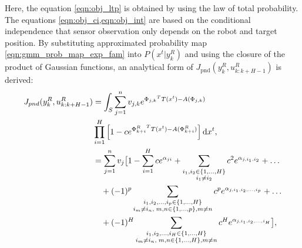 \documentclass[twocolumn,10pt]{asme2e}
\begin{document}
Here, the equation \cref{eqn:obj_ltp} is obtained by using the law of total probability.
The equations \cref{eqn:obj_ci,eqn:obj_int} are based on the conditional independence that sensor observation only depends on the robot and target position.
By substituting approximated probability map \cref{eqn:gmm_prob_map_exp_fam} into $P(x^t|y^R_{k})$ and using the closure of the product of Gaussian functions, an analytical form of $J_\text{pnd}(y^R_k,u^R_{k:k+H-1})$ is derived:
\begin{subequations}\label{eqn:obj_analy}
	\begin{align}
		J_{pnd}(y^R_k,u^R_{k:k+H-1})&=\int_S \sum\limits_{j=1}^{n}v_{j,k} e^{{\Phi_{j,k}}^TT(x^t)-A(\Phi_{j,k})}\notag\\ &\prod\limits_{i=1}^{H}\left[ 1-ce^{{\Phi^R_{k+i}}^TT(x^t)-A(\Phi^R_{k+i})}\right] \mathrm{d}x^t,\label{eqn:sub}\\
		& =\sum\limits_{j=1}^n v_j\big[1-\sum^H_{i=1} ce^{\alpha_{ji}}+\sum\limits_{\substack{ i_1,i_2 \in \left\lbrace 1,\dots,H\right\rbrace \\i_1\neq i_2}}c^2e^{\alpha_{j,i_1,i_2}}+\dots\notag\\
		&\quad+(-1)^p\sum\limits_{\substack{i_1,i_2,\dots,i_p\in \left\lbrace 1,\dots,H\right\rbrace\\i_m\neq i_n,\;m,n\in \left\lbrace 1,\dots,p\right\rbrace,m\neq n}}c^pe^{\alpha_{j,i_1,i_2,\dots,i_p}}+\dots\notag\\
		&\quad+(-1)^H\sum\limits_{\substack{i_1,i_2,\dots,i_H\in \left\lbrace 1,\dots,H\right\rbrace\\i_m\neq i_n,\;m,n\in \left\lbrace 1,\dots,H\right\rbrace,m\neq n}} c^He^{\alpha_{j,i_1,i_2,\dots,i_H}}\label{eqn:exp_obj_H} \big ],
	\end{align}
\end{subequations}
\end{document}
